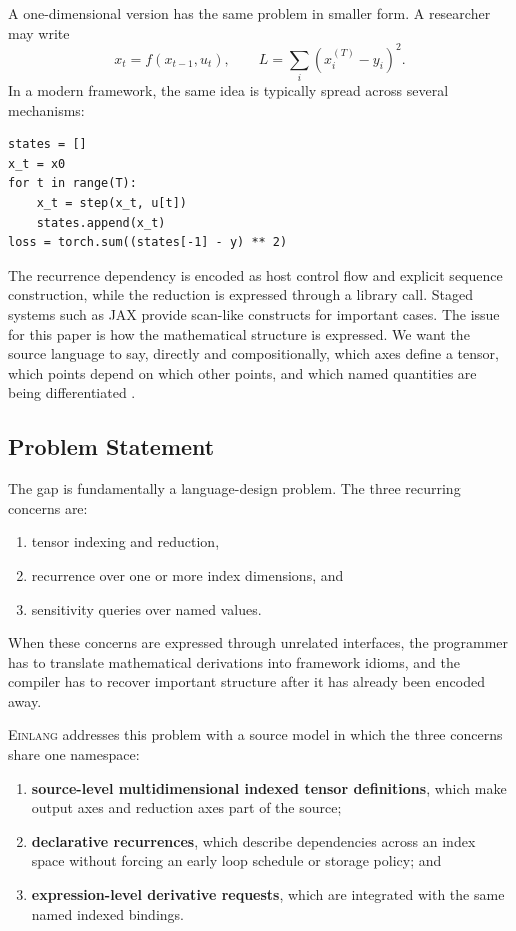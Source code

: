 \documentclass[sigplan,screen,nonacm]{acmart}
\newcommand{\einlang}{\textsc{Einlang}}
\begin{document}
A one-dimensional version has the same problem in smaller form. A researcher may write
\[
x_t = f(x_{t-1}, u_t),
\qquad
L = \sum_i (x^{(T)}_i - y_i)^2.
\]
In a modern framework, the same idea is typically spread across several mechanisms:

\noindent\begin{minipage}{\columnwidth}
\begin{lstlisting}[style=pythoncode]
states = []
x_t = x0
for t in range(T):
    x_t = step(x_t, u[t])
    states.append(x_t)
loss = torch.sum((states[-1] - y) ** 2)
\end{lstlisting}
\end{minipage}

The recurrence dependency is encoded as host control flow and explicit sequence construction, while the reduction is expressed through a library call. Staged systems such as JAX provide scan-like constructs for important cases. The issue for this paper is how the mathematical structure is expressed. We want the source language to say, directly and compositionally, which axes define a tensor, which points depend on which other points, and which named quantities are being differentiated \cite{numpy2020,tensorflow2016,pytorch2019,jax2018}.

\subsection{Problem Statement}

The gap is fundamentally a language-design problem. The three recurring concerns are:
\begin{enumerate}
\item tensor indexing and reduction,
\item recurrence over one or more index dimensions, and
\item sensitivity queries over named values.
\end{enumerate}
When these concerns are expressed through unrelated interfaces, the programmer has to translate mathematical derivations into framework idioms, and the compiler has to recover important structure after it has already been encoded away.

\einlang{} addresses this problem with a source model in which the three concerns share one namespace:
\begin{enumerate}
\item \textbf{source-level multidimensional indexed tensor definitions}, which make output axes and reduction axes part of the source;
\item \textbf{declarative recurrences}, which describe dependencies across an index space without forcing an early loop schedule or storage policy; and
\item \textbf{expression-level derivative requests}, which are integrated with the same named indexed bindings.
\end{enumerate}
\end{document}
